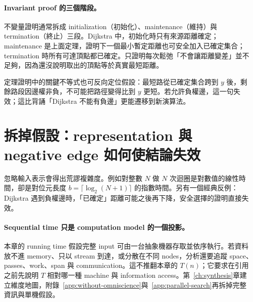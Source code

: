 \documentclass[11pt,a4paper,oneside,openany]{book}
\begin{document}
\paragraph{Invariant proof 的三個階段。}
不變量證明通常拆成 initialization（初始化）、maintenance（維持）與 termination（終止）三段。Dijkstra 中，初始化時只有來源距離確定；maintenance 是上面定理，證明下一個最小暫定距離也可安全加入已確定集合；termination 時所有可達頂點都已確定。只證明每次鬆弛「不會讓距離變差」並不足夠，因為還沒說明取出的頂點等於真實最短距離。

定理證明中的關鍵不等式也可反向定位假設：最短路從已確定集合跨到 $y$ 後，剩餘路段因邊權非負，不可能把路徑變得比到 $y$ 更短。若允許負權邊，這一句失效；這比背誦「Dijkstra 不能有負邊」更能遷移到新演算法。

\section{拆掉假設：representation 與 negative edge 如何使結論失效}
\begin{misconception}
忽略輸入表示會得出荒謬複雜度。例如對整數 $N$ 做 $N$ 次迴圈是對數值的線性時間，卻是對位元長度 $b=\lceil\log_2(N+1)\rceil$ 的指數時間。另有一個經典反例：Dijkstra 遇到負權邊時，「已確定」距離可能之後再下降，安全選擇的證明直接失效。
\end{misconception}

\paragraph{Sequential time 只是 computation model 的一個投影。}
本章的 running time 假設完整 input 可由一台抽象機器存取並依序執行。若資料放不進 memory、只以 stream 到達，或分散在不同 nodes，分析還要追蹤 space、passes、work、span 與 communication。這不推翻本章的 $T(n)$；它要求在引用之前先說明 $T$ 相對哪一種 machine 與 information access。第~\ref{ch:synthesis}章建立維度地圖，附錄~\ref{app:without-omniscience}與~\ref{app:parallel-search}再拆掉完整資訊與單機假設。
\end{document}
